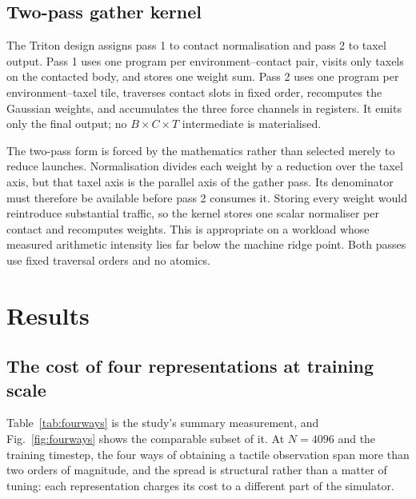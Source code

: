 \documentclass[journal]{IEEEtran}
\begin{document}
\subsection{Two-pass gather kernel}

The Triton design assigns pass 1 to contact normalisation and pass 2 to taxel output. Pass 1 uses one program per environment--contact pair, visits only taxels on the contacted body, and stores one weight sum. Pass 2 uses one program per environment--taxel tile, traverses contact slots in fixed order, recomputes the Gaussian weights, and accumulates the three force channels in registers. It emits only the final output; no $B\times C\times T$ intermediate is materialised.

The two-pass form is forced by the mathematics rather than selected merely to reduce launches. Normalisation divides each weight by a reduction over the taxel axis, but that taxel axis is the parallel axis of the gather pass. Its denominator must therefore be available before pass 2 consumes it. Storing every weight would reintroduce substantial traffic, so the kernel stores one scalar normaliser per contact and recomputes weights. This is appropriate on a workload whose measured arithmetic intensity lies far below the machine ridge point. Both passes use fixed traversal orders and no atomics.

\section{Results}

\subsection{The cost of four representations at training scale}
\label{sec:fourways}

Table~\ref{tab:fourways} is the study's summary measurement, and Fig.~\ref{fig:fourways} shows the comparable subset of it. At $N=4096$ and the training timestep, the four ways of obtaining a tactile observation span more than two orders of magnitude, and the spread is structural rather than a matter of tuning: each representation charges its cost to a different part of the simulator.
\end{document}
